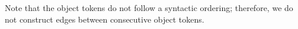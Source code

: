 \noindent Note that the object tokens do not follow a syntactic ordering; therefore, we do not construct edges between consecutive object tokens. 
    
    




